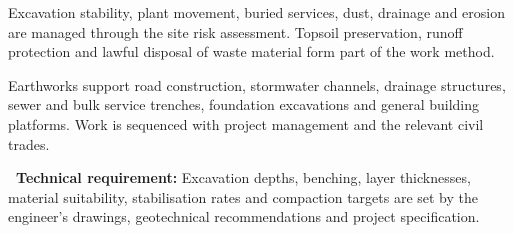 \documentclass[a4paper,11pt]{article}
\providecommand{\faShieldAlt}{\faShield*}
\begin{document}
\noindent
\begin{minipage}[t]{0.485\textwidth}
    \begin{tcolorbox}[enhanced,colback=white,colframe=mhlightgray,
        boxrule=0.8pt,arc=4pt,
        title={\bfseries\color{white}\faShieldAlt\ Safety \& Environmental Controls},
        colbacktitle=mhnavy,left=8pt,right=8pt,top=7pt,bottom=7pt,
        drop shadow=black!4]
        {\fontsize{8.1pt}{11.3pt}\selectfont\color{mhtext}
        Excavation stability, plant movement, buried services, dust,
        drainage and erosion are managed through the site risk assessment.
        Topsoil preservation, runoff protection and lawful disposal of
        waste material form part of the work method.
        }
    \end{tcolorbox}
\end{minipage}
\hfill
\begin{minipage}[t]{0.485\textwidth}
    \begin{tcolorbox}[enhanced,colback=white,colframe=mhlightgray,
        boxrule=0.8pt,arc=4pt,
        title={\bfseries\color{white}\faRoad\ Related Civil Engineering Works},
        colbacktitle=mhblue,left=8pt,right=8pt,top=7pt,bottom=7pt,
        drop shadow=black!4]
        {\fontsize{8.1pt}{11.3pt}\selectfont\color{mhtext}
        Earthworks support road construction, stormwater channels,
        drainage structures, sewer and bulk service trenches, foundation
        excavations and general building platforms. Work is sequenced
        with project management and the relevant civil trades.
        }
    \end{tcolorbox}
\end{minipage}

\vfill

\noindent
\begin{tcolorbox}[enhanced,colback=white,colframe=mhnavy,
    boxrule=0.8pt,arc=3pt,left=8pt,right=8pt,top=6pt,bottom=6pt,
    drop shadow=black!3]
    {\fontsize{8pt}{10.6pt}\selectfont\color{mhnavy}\bfseries
    \faCheckCircle\ Technical requirement:}\quad
    {\fontsize{8pt}{10.6pt}\selectfont\color{mhtext}
    Excavation depths, benching, layer thicknesses, material suitability,
    stabilisation rates and compaction targets are set by the engineer's
    drawings, geotechnical recommendations and project specification.
    }
\end{tcolorbox}
\end{document}
